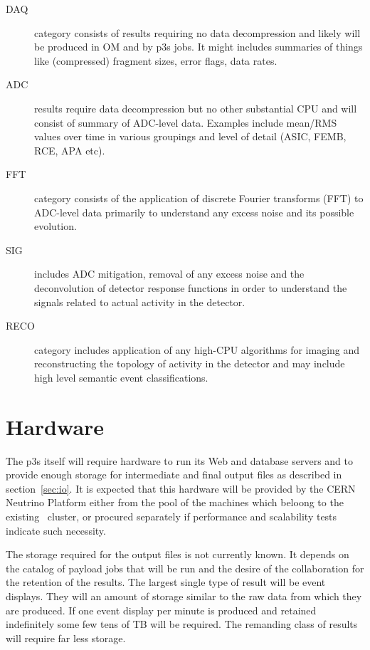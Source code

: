 \documentclass[pdftex,12pt,letter]{article}
\begin{document}
\begin{description}

\item[DAQ] category consists of results requiring no data
  decompression and likely will be produced in OM and by p3s jobs.  It
  might includes summaries of things like (compressed) fragment sizes,
  error flags, data rates.

\item[ADC] results require data decompression but no other substantial
  CPU and will consist of summary of ADC-level data.  Examples include
  mean/RMS values over time in various groupings and level of detail
  (ASIC, FEMB, RCE, APA etc).

\item[FFT] category consists of the application of discrete Fourier
  transforms (FFT) to ADC-level data primarily to understand any
  excess noise and its possible evolution.

\item[SIG] includes ADC mitigation, removal of any excess noise and
  the deconvolution of detector response functions in order to
  understand the signals related to actual activity in the detector.

\item[RECO] category includes application of any high-CPU algorithms
  for imaging and reconstructing the topology of activity in the
  detector and may include high level semantic event classifications.

\end{description}

\section{Hardware}
\label{sec:hardware}
The p3s itself will require hardware to run its Web and database
servers and to provide enough storage for intermediate and final
output files as described in section~\ref{sec:io}.  It is expected
that this hardware will be provided by the CERN Neutrino Platform
either from the pool of the machines which beloong to the
existing~\cite{neut} cluster, or procured separately if performance
and scalability tests indicate such necessity.


The storage required for the output files is not currently known.  It
depends on the catalog of payload jobs that will be run and the desire
of the collaboration for the retention of the results.  The largest
single type of result will be event displays.  They will an amount of
storage similar to the raw data from which they are produced.  If one
event display per minute is produced and retained indefinitely some
few tens of TB will be required.  The remanding class of results will
require far less storage.
\end{document}
